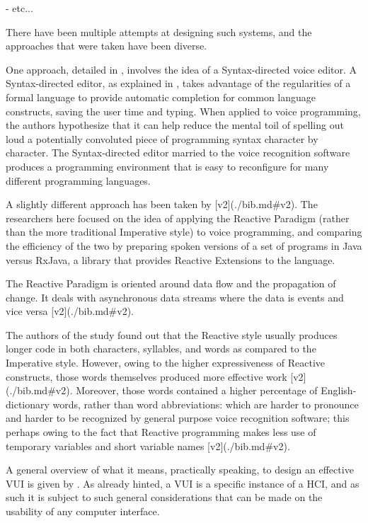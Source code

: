 - etc...

There have been multiple attempts at designing such systems, and the approaches that were taken have been diverse.

One approach, detailed in \cite{arnold2000programming}, involves the idea of a Syntax-directed voice editor. A Syntax-directed editor, as explained in \cite{arnold2000programming}, takes advantage of the regularities of a formal language to provide automatic completion for common language constructs, saving the user time and typing. When applied to voice programming, the authors hypothesize that it can help reduce the mental toil of spelling out loud a potentially convoluted piece of programming syntax character by character. The Syntax-directed editor married to the voice recognition software produces a programming environment that is easy to reconfigure for many different programming languages.

A slightly different approach has been taken by [v2](./bib.md#v2). The researchers here focused on the idea of applying the Reactive Paradigm (rather than the more traditional Imperative style) to voice programming, and comparing the efficiency of the two by preparing spoken versions of a set of programs in Java versus RxJava, a library that provides Reactive Extensions to the language.

The Reactive Paradigm is oriented around data flow and the propagation of change. It deals with asynchronous data streams where the data is events and vice versa [v2](./bib.md#v2).

The authors of the study found out that the Reactive style usually produces longer code in both characters, syllables, and words as compared to the Imperative style. However, owing to the higher expressiveness of Reactive constructs, those words themselves produced more effective work [v2](./bib.md#v2). Moreover, those words contained a higher percentage of English-dictionary words, rather than word abbreviations: which are harder to pronounce and harder to be recognized by general purpose voice recognition software; this perhaps owing to the fact that Reactive programming makes less use of temporary variables and short variable names [v2](./bib.md#v2).

A general overview of what it means, practically speaking, to design an effective VUI is given by \cite{farinazzo2010empirical}. As already hinted, a VUI is a specific instance of a HCI, and as such it is subject to such general considerations that can be made on the usability of any computer interface.

